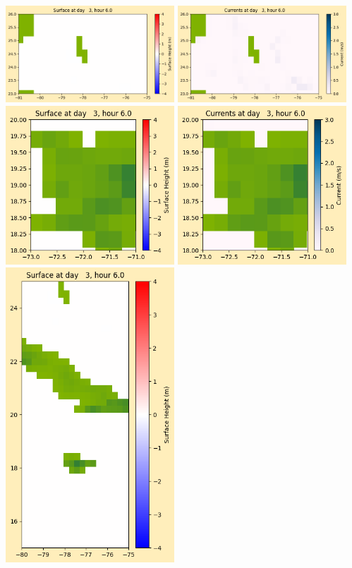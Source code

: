 \documentclass[11pt]{article}
\begin{document}
\vskip 10pt 
\includegraphics[width=0.475\textwidth]{frame0025fig1003.png}
\includegraphics[width=0.475\textwidth]{frame0025fig1004.png}
\vskip 10pt 
\includegraphics[width=0.475\textwidth]{frame0025fig1005.png}
\includegraphics[width=0.475\textwidth]{frame0025fig1006.png}
\vskip 10pt 
\includegraphics[width=0.475\textwidth]{frame0025fig1007.png}
\end{document}
